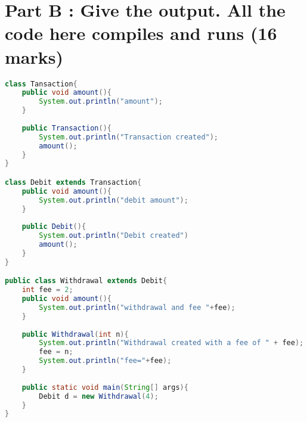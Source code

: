 \documentclass{article}
\begin{document}
\section{Part B : Give the output. All the code here compiles and runs (16 marks)}
\begin{lstlisting}[language=Java, left=numbers]
class Tansaction{
	public void amount(){
		System.out.println("amount");
	}
	
	public Transaction(){
		System.out.println("Transaction created");
		amount();
	}
}

class Debit extends Transaction{
	public void amount(){
		System.out.println("debit amount");
	}
	
	public Debit(){
		System.out.println("Debit created")
		amount();
	}
}

public class Withdrawal extends Debit{
	int fee = 2;
	public void amount(){
		System.out.println("withdrawal and fee "+fee);
	}
	
	public Withdrawal(int n){
		System.out.println("Withdrawal created with a fee of " + fee);
		fee = n;
		System.out.println("fee="+fee);
	}
	
	public static void main(String[] args){
		Debit d = new Withdrawal(4);
	}
}
\end{lstlisting}
\end{document}
